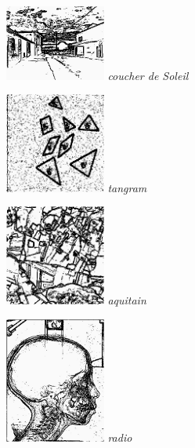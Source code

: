 \documentclass[a4,12pt]{article}
\begin{document}
\noindent
\begin{minipage}[c]{0.20\linewidth}
	\begin{center}
		\includegraphics[width = 33mm]{./img/p2test_grad_mean_soleil.jpg}
		\textit{coucher de Soleil}
	\end{center}
\end{minipage}
\begin{minipage}[c]{0.20\linewidth}
	\begin{center}
		\includegraphics[width = 33mm]{./img/p2test_grad_mean_tangram.jpg}
		\textit{tangram}
	\end{center}
\end{minipage}
\begin{minipage}[c]{0.20\linewidth}
	\begin{center}
		\includegraphics[width = 33mm]{./img/p2test_grad_mean_aquitain.jpg}
		\textit{aquitain}
	\end{center}
\end{minipage}
\begin{minipage}[c]{0.20\linewidth}
	\begin{center}
		\includegraphics[width = 33mm]{./img/p2test_grad_mean_radio1.jpg}
		\textit{radio}
	\end{center}
\end{minipage}
\end{document}
